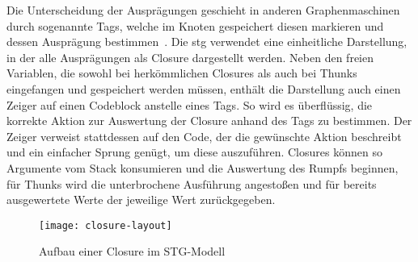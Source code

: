 Die Unterscheidung der Ausprägungen geschieht in anderen Graphenmaschinen durch sogenannte Tags, welche im Knoten gespeichert diesen markieren und dessen Ausprägung bestimmen~\cite{Kieburtz_GMachineFast,Augustsson_vGMachine,Kingdon_HDGMachine}.
Die \gls{stg} verwendet eine einheitliche Darstellung, in der alle Ausprägungen als Closure dargestellt werden.
Neben den freien Variablen, die sowohl bei herkömmlichen Closures als auch bei Thunks eingefangen und gespeichert werden müssen, enthält die Darstellung auch einen Zeiger auf einen Codeblock anstelle eines Tags.
So wird es überflüssig, die korrekte Aktion zur Auswertung der Closure anhand des Tags zu bestimmen.
Der Zeiger verweist stattdessen auf den Code, der die gewünschte Aktion beschreibt und ein einfacher Sprung genügt, um diese auszuführen.
Closures können so Argumente vom Stack konsumieren und die Auswertung des Rumpfs beginnen, für Thunks wird die unterbrochene Ausführung angestoßen und für bereits ausgewertete Werte der jeweilige Wert zurückgegeben.

\vfill

\begin{figure}[h]
  \centering
  \texttt{[image: closure-layout]}
  \caption{Aufbau einer Closure im STG-Modell}\label{fig:closure}
\end{figure}

\vfill

